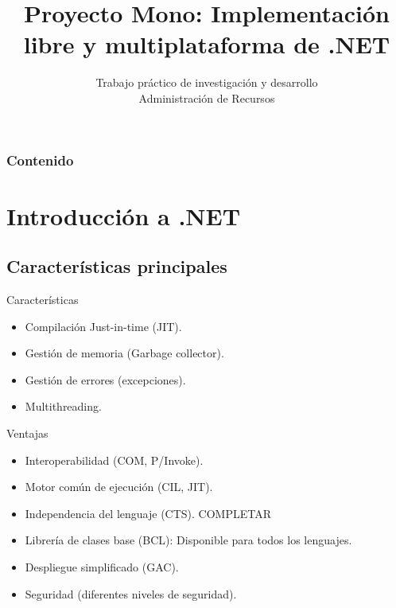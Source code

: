 \documentclass{beamer}
\title[Proyecto Mono]
{Proyecto Mono: Implementación libre y multiplataforma de .NET}
\date[TP Adm. de Recursos]
{Trabajo práctico de investigación y desarrollo \\ Administración de Recursos}
\begin{document}
\begin{frame}
  \titlepage
\end{frame}

\begin{frame}
  \frametitle{Contenido}
  \begin{scriptsize}
  \tableofcontents
  \end{scriptsize}
\end{frame}




\section{Introducción a .NET}

\subsection{Características principales}

\begin{frame}{Características}
  \begin{itemize}
    \item Compilación Just-in-time (JIT).
    \item Gestión de memoria (Garbage collector).
    \item Gestión de errores (excepciones).
    \item Multithreading.
  \end{itemize}
\end{frame}

\begin{frame}{Ventajas}
  \begin{itemize}
    \item Interoperabilidad (COM, P/Invoke).
    \item Motor común de ejecución (CIL, JIT).
    \item Independencia del lenguaje (CTS). COMPLETAR
    \item Librería de clases base (BCL): Disponible para todos los lenguajes.
    \item Despliegue simplificado (GAC).
    \item Seguridad (diferentes niveles de seguridad).
  \end{itemize}
\end{frame}
\end{document}
